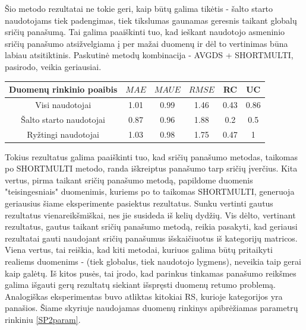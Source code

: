 \documentclass{VUMIFInfMagistrinis}
\begin{document}
\indent
Šio metodo rezultatai ne tokie geri, kaip būtų galima tikėtis - šalto starto naudotojams tiek padengimas, tiek tikslumas gaunamas geresnis taikant globalų sričių panašumą. Tai galima paaiškinti tuo, kad ieškant naudotojo asmeninio sričių panašumo atsižvelgiama į per mažai duomenų ir dėl to vertinimas būna labiau atsitiktinis. 
\newline
\indent 
Paskutinė metodų kombinacija - AVGDS + SHORTMULTI, pasirodo, veikia geriausiai.
\begin{center}
	\begin{tabular}{||c c c c c c||} 
		Duomenų rinkinio poaibis & $MAE$ & $MAUE$ & $RMSE$ & RC & UC \\
		\hline
		Visi naudotojai & 1.01 & 0.99 & 1.46 & 0.43 & 0.86 \\
		\hline
		Šalto starto naudotojai & 0.87 & 0.96 & 1.88 & 0.2 & 0.5 \\
		\hline
		Ryžtingi naudotojai & 1.03 & 0.98 & 1.75 & 0.47 & 1 \\
	\end{tabular}
\end{center} 
Tokius rezultatus galima paaiškinti tuo, kad sričių panašumo metodas, taikomas po SHORTMULTI metodo, randa iškreiptus panašumo tarp sričių įverčius. Kita vertus, pirma taikant  sričių panašumo metodą, papildome duomenis "teisingesniais" duomenimis, kuriems po to taikomas SHORTMULTI, generuoja geriausius šiame eksperimente pasiektus rezultatus. 
\newline
\indent 
Sunku vertinti gautus rezultatus vienareikšmiškai, nes jie susideda iš kelių dydžių. Vis dėlto, vertinant rezultatus, gautus taikant sričių panašumo metodą, reikia pasakyti, kad geriausi rezultatai gauti naudojant sričių panašumus išskaičiuotus iš kategorijų matricos. Viena vertus, tai reiškia, kad kiti metodai, kuriuos galima būtų pritaikyti realiems duomenims - (tiek globalus, tiek naudotojo lygmens), neveikia taip gerai kaip galėtų. Iš kitos pusės, tai įrodo, kad parinkus tinkamas panašumo reikšmes galima išgauti gerų rezultatų siekiant išspręsti duomenų retumo problemą.
\indent 
Analogiškas eksperimentas buvo atliktas kitokiai RS, kurioje kategorijos yra panašios. Šiame skyriuje naudojamas duomenų rinkinys apibrėžiamas parametrų rinkiniu \ref{SP2param}.
\end{document}
